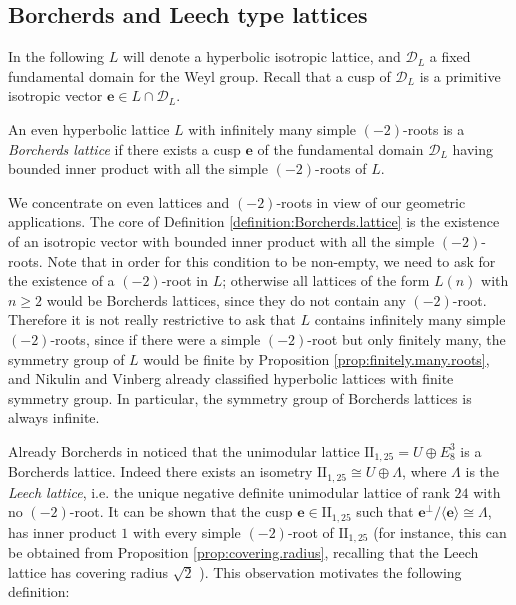 \documentclass[11pt,letterpaper]{amsart}
\newcommand{\vect}[1]{\boldsymbol{#1}}
\begin{document}
\subsection{Borcherds and Leech type lattices}

In the following $L$ will denote a hyperbolic isotropic lattice, and $\mathcal{D}_L$ a fixed fundamental domain for the Weyl group. 
Recall that a cusp of $\mathcal{D}_L$ is a primitive isotropic vector $\vect{e} \in L\cap \mathcal{D}_L$.

\begin{definition} \label{definition:Borcherds.lattice}
An even hyperbolic lattice $L$ with infinitely many simple $(-2)$-roots is a \emph{Borcherds lattice} if there exists a cusp $\vect{e}$ of the fundamental domain $\mathcal{D}_L$  having bounded inner product with all the simple $(-2)$-roots of $L$.
\end{definition}

We concentrate on even lattices and $(-2)$-roots in view of our geometric applications.
The core of Definition \ref{definition:Borcherds.lattice} is the existence of an isotropic vector with bounded inner product with all the simple $(-2)$-roots. 
Note that in order for this condition to be non-empty, we need to ask for the existence of a $(-2)$-root in $L$; otherwise all lattices of the form $L(n)$ with $n\ge 2$ would be Borcherds lattices, since they do not contain any $(-2)$-root.
Therefore it is not really restrictive to ask that $L$ contains infinitely many simple $(-2)$-roots, since if there were a simple $(-2)$-root but only finitely many, the symmetry group of $L$ would be finite by Proposition \ref{prop:finitely.many.roots}, and Nikulin \cite{nikulin.finite.aut.3, nikulin.finite.aut.greater.5} and Vinberg \cite{vinberg.finite.aut.4} already classified hyperbolic lattices with finite symmetry group. In particular, the symmetry group of Borcherds lattices is always infinite.




Already Borcherds in \cite{borcherds.leech} noticed that the unimodular lattice $\mathrm{II}_{1,25}=U\oplus E_8^3$ is a Borcherds lattice. Indeed there exists an isometry $\mathrm{II}_{1,25}\cong U\oplus \Lambda$, where $\Lambda$ is the \emph{Leech lattice}, i.e. the unique negative definite unimodular lattice of rank $24$ with no $(-2)$-root. It can be shown that the cusp $\vect{e}\in \mathrm{II}_{1,25}$ such that $\vect{e}^\perp/\langle \vect{e}\rangle \cong \Lambda$, has inner product $1$ with every simple $(-2)$-root of $\mathrm{II}_{1,25}$ (for instance, this can be obtained from Proposition \ref{prop:covering.radius}, recalling that the Leech lattice has covering radius $\sqrt{2}$ \cite[{\S}23,~Theorem~1]{conway.sloane.lattices}). This observation motivates the following definition:
\end{document}
